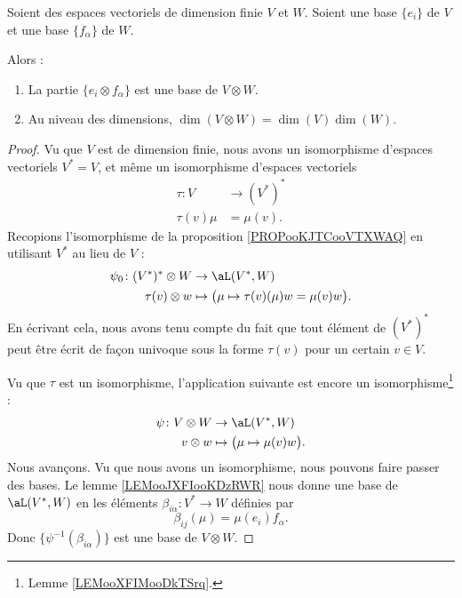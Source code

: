 \begin{proposition}      \label{PROPooTHDPooWgjUwk}
	Soient des espaces vectoriels de dimension finie \( V\) et \( W\). Soient une base \( \{e_i\}\) de \( V\) et une base \( \{f_{\alpha}\}\) de \( W\).

	Alors :
	\begin{enumerate}
		\item       \label{ITEMooQCILooUncdGl}
		      La partie \( \{e_i\otimes f_{\alpha}\}\) est une base de \( V\otimes W\).
		\item			\label{ITEMooGCRHooJjAYPr}
		      Au niveau des dimensions, \( \dim(V\otimes W)=\dim(V)\dim(W)\).
	\end{enumerate}
\end{proposition}

\begin{proof}
	Vu que \( V\) est de dimension finie, nous avons un isomorphisme d'espaces vectoriels \( V^*=V\), et même un isomorphisme d'espaces vectoriels
	\begin{equation}
		\begin{aligned}
			\tau\colon V & \to (V^*)^* \\
			\tau(v)\mu   & =\mu(v).
		\end{aligned}
	\end{equation}
	Recopions l'isomorphisme de la proposition \ref{PROPooKJTCooVTXWAQ} en utilisant \( V^*\) au lieu de \( V\) :
	\begin{equation}
		\begin{aligned}
			\psi_0\colon (V^*)^*\otimes W & \to \aL(V^*,W)                                         \\
			\tau(v)\otimes w              & \mapsto \big( \mu\mapsto \tau(v)(\mu)w =\mu(v)w \big).
		\end{aligned}
	\end{equation}
	En écrivant cela, nous avons tenu compte du fait que tout élément de \( (V^*)^*\) peut être écrit de façon univoque sous la forme \( \tau(v)\) pour un certain \( v\in V\).

	Vu que \( \tau\) est un isomorphisme, l'application suivante est encore un isomorphisme\footnote{Lemme \ref{LEMooXFIMooDkTSrq}.} :
	\begin{equation}        \label{EQooAEFRooPfmAnj}
		\begin{aligned}
			\psi\colon V\otimes W & \to \aL(V^*,W)                          \\
			v\otimes w            & \mapsto \big( \mu\mapsto \mu(v)w \big).
		\end{aligned}
	\end{equation}
	Nous avançons. Vu que nous avons un isomorphisme, nous pouvons faire passer des bases. Le lemme \ref{LEMooJXFIooKDzRWR} nous donne une base de \( \aL(V^*,W)\) en les éléments \( \beta_{i\alpha}\colon V^*\to W\) définies par
	\begin{equation}
		\beta_{ij}(\mu)=\mu(e_i)f_{\alpha}.
	\end{equation}
	Donc \( \{ \psi^{-1}(\beta_{i\alpha}) \}\) est une base de \( V\otimes W\).


\end{proof}
